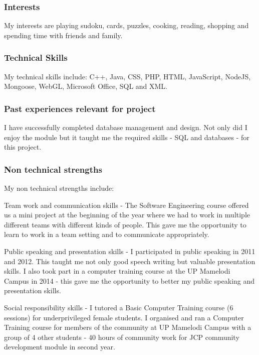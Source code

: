 \documentclass[hidelinks, 12pt, oneside]{article}
\begin{document}
\subsubsection{Interests}

My interests are playing sudoku, cards, puzzles, cooking, reading, shopping and spending time with friends and family.

\subsubsection{Technical Skills}

My technical skills include: C++, Java, CSS, PHP, HTML, JavaScript, NodeJS, Mongoose, WebGL, Microsoft Office, SQL and XML.
 
\subsubsection{Past experiences relevant for project}

I have successfully completed database management and design. Not only did I enjoy the module but it taught me the required skills - SQL and databases - for this project. 

\subsubsection{Non technical strengths}

My non technical strengths include: 

Team work and communication skills - The Software Engineering course offered us a mini project at the beginning of the year where we had to work in multiple different teams with different kinds of people. This gave me the opportunity to learn to work in a team setting and to communicate appropriately.
 
Public speaking and presentation skills - I participated in public speaking in 2011 and 2012. This taught me not only good speech writing but valuable presentation skills.
I also took part in a computer training course at the UP Mamelodi Campus in 2014 - this gave me the opportunity to better my public speaking and presentation skills.

Social responsibility skills - I tutored a Basic Computer Training course (6 sessions) for underprivileged female students.
I organised and ran a Computer Training course for members of the community at UP Mamelodi Campus with a group of 4 other students - 40 hours of community work for JCP community development module in second year.
\end{document}
